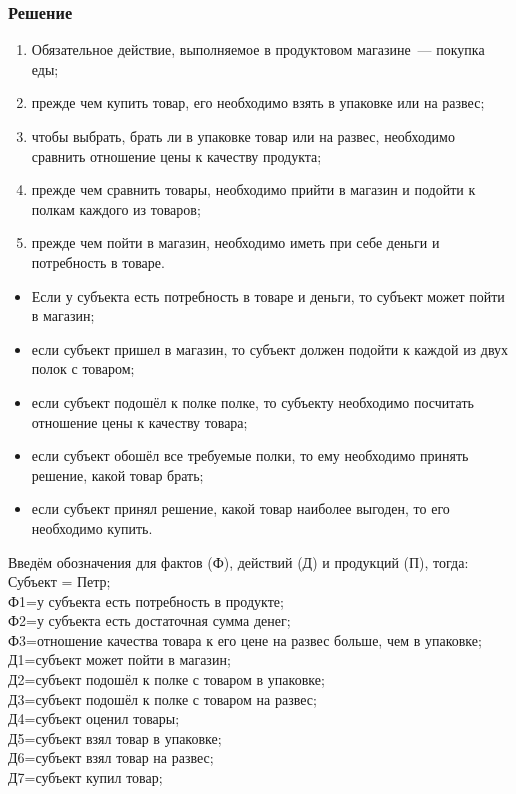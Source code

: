 \documentclass[14pt, a4paper, titlepage]{extarticle}
\begin{document}
\subsubsection*{Решение}

\begin{enumerate}
	\item Обязательное действие, выполняемое в продуктовом магазине~--- покупка еды;
	\item прежде чем купить товар, его необходимо взять в упаковке или на развес;
	\item чтобы выбрать, брать ли в упаковке товар или на развес, необходимо сравнить отношение цены к качеству продукта;
	\item прежде чем сравнить товары, необходимо прийти в магазин и подойти к полкам каждого из товаров;
	\item прежде чем пойти в магазин, необходимо иметь при себе деньги и потребность в товаре.
\end{enumerate}

\begin{itemize}
	\item Если у субъекта есть потребность в товаре и деньги, то субъект может пойти в магазин;
	\item если субъект пришел в магазин, то субъект должен подойти к каждой из двух полок с товаром;
	\item если субъект подошёл к полке полке, то субъекту необходимо посчитать отношение цены к качеству товара;
	\item если субъект обошёл все требуемые полки, то ему необходимо принять решение, какой товар брать;
	\item если субъект принял решение, какой товар наиболее выгоден, то его необходимо купить.
\end{itemize}

Введём обозначения для фактов (Ф), действий (Д) и продукций (П), тогда:\\
Субъект = Петр;\\
Ф1=у субъекта есть потребность в продукте;\\
Ф2=у субъекта есть достаточная сумма денег;\\
Ф3=отношение качества товара к его цене на развес больше, чем в упаковке;\\
Д1=субъект может пойти в магазин;\\
Д2=субъект подошёл к полке с товаром в упаковке;\\
Д3=субъект подошёл к полке с товаром на развес;\\
Д4=субъект оценил товары;\\
Д5=субъект взял товар в упаковке;\\
Д6=субъект взял товар на развес;\\
Д7=субъект купил товар;\\
\end{document}
